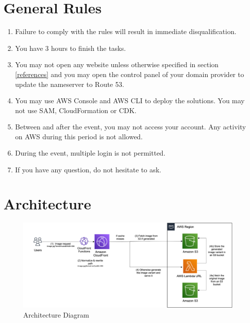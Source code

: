 \documentclass{article}
\begin{document}
\section{General Rules}
\begin{enumerate}
    \item Failure to comply with the rules will result in immediate disqualification.
    \item You have 3 hours to finish the tasks.
    \item You may not open any website unless otherwise specified in section \ref{references} and you may open the control panel of your domain provider to update the nameserver to Route 53.
    \item You may use AWS Console and AWS CLI to deploy the solutions. You may not use SAM, CloudFormation or CDK.
    \item Between and after the event, you may not access your account. Any activity on AWS during this period is not allowed.
    \item During the event, multiple login is not permitted.
    \item If you have any question, do not hesitate to ask.
\end{enumerate}
\section{Architecture}\label{architecture}
\begin{figure}[h]
\centering
\includegraphics[width=\textwidth]{architecture.png}
\caption{\label{fig:architecture}Architecture Diagram}
\end{figure}
\end{document}
